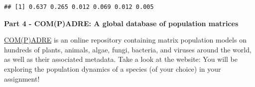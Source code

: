 \documentclass[
]{book}
\begin{document}
\begin{verbatim}
## [1] 0.637 0.265 0.012 0.069 0.012 0.005
\end{verbatim}

\textbf{Part 4 - COM(P)ADRE: A global database of population matrices}

\href{https://compadre-db.org/ExploreDatabase}{COM(P)ADRE} is an online repository containing matrix population models on hundreds of plants, animals, algae, fungi, bacteria, and viruses around the world, as well as their associated metadata. Take a look at the website: You will be exploring the population dynamics of a species (of your choice) in your assignment!

  
\end{document}

